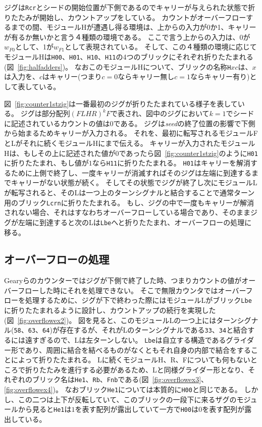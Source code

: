 \documentclass[a4j,11pt]{article}
\begin{document}
ジグは\texttt{Rcr}とシードの開始位置が下側であるのでキャリーが与えられた状態で折りたたみが開始し、カウントアップをしている。
カウントがオーバーフローするまでの間、モジュールHが遭遇し得る環境は、上からの入力が0か1、キャリーが有るか無いかと言う４種類の環境である。
ここで言う上からの入力は、0が$w_{F0}$として、1が$w_{F1}$として表現されている。
そして、この４種類の環境に応じてモジュールHは\texttt{H00}、\texttt{H01}、\texttt{H10}、\texttt{H11}の4つのブリックにそれぞれ折りたたまれる(図~\ref{fig:halfadders})。
なおこのモジュールHについて、ブリックの名称\texttt{H}$xc$は、$x$は入力を、$c$はキャリー(つまり$c=0$ならキャリー無し$c=1$ならキャリー有り)として表している。

図~\ref{fig:counter1stzig}は一番最初のジグが折りたたまれている様子を表している。
ジグは部分配列$(FLHR)^kF$で表され、図中のジグにおいて$k=1$でシードに記述されているカウントの値は$0$である。
ジグは\textit{seed}の終了位置の影響で下側から始まるためキャリーが入力される。
それを、最初に転写されるモジュールFとLがそれに続くモジュールHにまで伝える。
キャリーが入力されたモジュールHは、もしその上に記述された値が$0$であったら図~\ref{fig:counter1stzig}のように\texttt{H01}に折りたたまれ、もし値が$1$なら\texttt{H11}に折りたたまれる。
\texttt{H01}はキャリーを解消するために上側で終了し、一度キャリーが消滅すればそのジグは左端に到達するまでキャリーがない状態が続く。
そしてその状態でジグが終了し次にモジュールLが転写されると、そのLは一つ上のターンシグナルと結合することで通常ターン用のブリック\texttt{Lcrn}に折りたたまれる。
もし、ジグの中で一度もキャリーが解消されない場合、それはすなわちオーバーフローしている場合であり、そのままジグが左端に到達すると次のLは\texttt{Lbe}へと折りたたまれ、オーバーフローの処理に移る。



\subsection{オーバーフローの処理}
Gearyらのカウンターではジグが下側で終了した時、つまりカウントの値がオーバーフローした時にそれを処理できない。
そこで無限カウンタではオーバーフローを処理するために、ジグが下で終わった際にはモジュールLがブリック\texttt{Lbe}に折りたたまれるように設計し、カウントアップの続行を実現した(図~\ref{fig:overflowex2})。
図を見ると、このモジュールLの一つ上にはターンシグナル(\texttt{58}、\texttt{63}、\texttt{64})が存在するが、それがLのターンシグナルである\texttt{33}、\texttt{34}と結合するには遠すぎるので、Lは左ターンしない。
\texttt{Lbe}は自立する構造であるグライダー形であり、周囲に結合を結べるものがなくともそれ自身の内部で結合をすることによって折りたたまれる。
Lに続くモジュールH、R、Fについても何もないところで折りたたみを進行する必要があるため、Lと同様グライダー形となり、それぞれのブリック名は\texttt{He1}、\texttt{Rb}、\texttt{Fnb}である(図~\ref{fig:overflowex3}、\ref{fig:overflowex4})。
なおブリック\texttt{He1}については本質的に\texttt{H00}と同じである。
しかし、この二つは上下が反転していて、このブリックの一段下に来るザグのモジュールから見ると\texttt{He1}は$1$を表す配列が露出していて一方で\texttt{H00}は$0$を表す配列が露出している。
\end{document}
